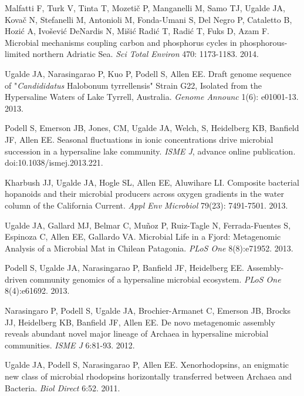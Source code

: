 \begin{frontmatter}
\begin{vitapage}
\begin{publications}
  \item Malfatti F, Turk V, Tinta T, Mozeti\v{c} P, Manganelli M, Samo TJ, Ugalde JA, Kova\v{c} N, Stefanelli M, Antonioli M, Fonda-Umani S, Del Negro P, Cataletto B, Hozi\'{c} A, Ivo\v{s}evi\'{c} DeNardis N, Mi\v{s}i\'{c} Radi\'{c} T, Radi\'{c} T, Fuks D, Azam F. Microbial mechanisms coupling carbon and phosphorus cycles in phosphorous-limited northern Adriatic Sea. \emph{Sci Total Environ} 470: 1173-1183. 2014.
  
  \item Ugalde JA, Narasingarao P, Kuo P, Podell S, Allen EE. Draft genome sequence of "\emph{Candididatus} Halobonum tyrrellensis" Strain G22, Isolated from the Hypersaline Waters of Lake Tyrrell, Australia.  \emph{Genome Announc} 1(6): e01001-13. 2013.
  
  \item Podell S, Emerson JB, Jones, CM, Ugalde JA, Welch, S, Heidelberg KB, Banfield JF, Allen EE. Seasonal fluctuations in ionic concentrations drive microbial succession in a hypersaline lake community. \emph{ISME J}, advance online publication. doi:10.1038/ismej.2013.221.
  
  \item Kharbush JJ, Ugalde JA, Hogle SL, Allen EE, Aluwihare LI. Composite bacterial hopanoids and their microbial producers across oxygen gradients in the water column of the California Current. \emph{Appl Env Microbiol} 79(23): 7491-7501. 2013.
  
  \item Ugalde JA, Gallard MJ, Belmar C, Mu\~{n}oz P, Ruiz-Tagle N, Ferrada-Fuentes S, Espinoza C, Allen EE, Gallardo VA. Microbial Life in a Fjord: Metagenomic Analysis of a Microbial Mat in Chilean Patagonia. \emph{PLoS One} 8(8):e71952. 2013.
  
  \item Podell S, Ugalde JA, Narasingarao P, Banfield JF, Heidelberg EE. Assembly-driven community genomics of a hypersaline microbial ecosystem. \emph{PLoS One} 8(4):e61692. 2013.
  
   \item Narasingaro P, Podell S, Ugalde JA, Brochier-Armanet C, Emerson JB, Brocks JJ, Heidelberg KB, Banfield JF, Allen EE. De novo metagenomic assembly reveals abundant novel major lineage of Archaea in hypersaline microbial communities. \emph{ISME J} 6:81-93. 2012.
  
  \item Ugalde JA, Podell S, Narasingarao P, Allen EE. Xenorhodopsins, an enigmatic new class of microbial rhodopsins horizontally transferred between Archaea and Bacteria. \emph{Biol Direct} 6:52. 2011.
  

\end{publications}
\end{vitapage}
\end{frontmatter}

